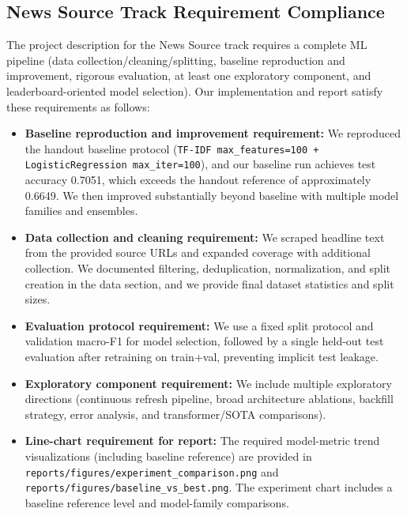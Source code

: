 \documentclass[10pt]{article}
\begin{document}
\subsection{News Source Track Requirement Compliance}
The project description for the News Source track requires a complete ML pipeline (data collection/cleaning/splitting, baseline reproduction and improvement, rigorous evaluation, at least one exploratory component, and leaderboard-oriented model selection). Our implementation and report satisfy these requirements as follows:
\begin{itemize}
    \item \textbf{Baseline reproduction and improvement requirement:} We reproduced the handout baseline protocol (\texttt{TF-IDF max\_features=100 + LogisticRegression max\_iter=100}), and our baseline run achieves test accuracy 0.7051, which exceeds the handout reference of approximately 0.6649. We then improved substantially beyond baseline with multiple model families and ensembles.
    \item \textbf{Data collection and cleaning requirement:} We scraped headline text from the provided source URLs and expanded coverage with additional collection. We documented filtering, deduplication, normalization, and split creation in the data section, and we provide final dataset statistics and split sizes.
    \item \textbf{Evaluation protocol requirement:} We use a fixed split protocol and validation macro-F1 for model selection, followed by a single held-out test evaluation after retraining on train+val, preventing implicit test leakage.
    \item \textbf{Exploratory component requirement:} We include multiple exploratory directions (continuous refresh pipeline, broad architecture ablations, backfill strategy, error analysis, and transformer/SOTA comparisons).
    \item \textbf{Line-chart requirement for report:} The required model-metric trend visualizations (including baseline reference) are provided in \texttt{reports/figures/experiment\_comparison.png} and \texttt{reports/figures/baseline\_vs\_best.png}. The experiment chart includes a baseline reference level and model-family comparisons.
\end{itemize}
\end{document}
